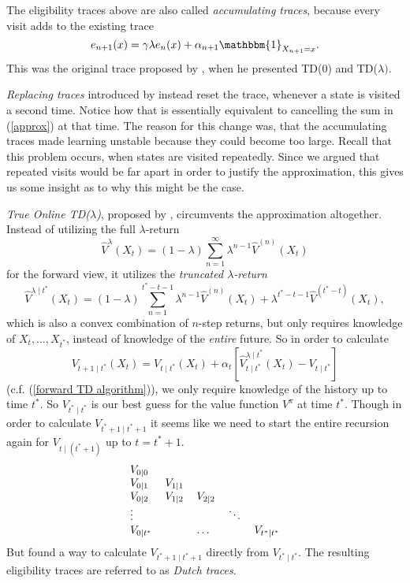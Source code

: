 The eligibility traces above are also called \emph{accumulating traces}, because every visit adds to the existing trace
\[
	e_{n+1}(x) = \gamma\lambda e_n(x) + \alpha_{n+1} \mathbbm{1}_{X_{n+1}=x}.
\]
This was the original trace proposed by \textcite{suttonLearningPredictMethods1988}, when he presented TD(0) and TD(\(\lambda)\). 

\emph{Replacing traces} introduced by \textcite{singhReinforcementLearningReplacing1996} instead reset the trace, whenever a state is visited a second time. Notice how that is essentially equivalent to cancelling the sum in (\ref{approx}) at that time. The reason for this change was, that the accumulating traces made learning unstable because they could become too large. Recall that this problem occurs, when states are visited repeatedly. Since we argued that repeated visits would be far apart in order to justify the approximation, this gives us some insight as to why this might be the case. 

\emph{True Online TD(\(\lambda\))}, proposed by \textcite{vanseijenTrueOnlineTD2014}, circumvents the approximation altogether. Instead of utilizing the full \(\lambda\)-return
\[
	\hat{V}^\lambda(X_t)=(1-\lambda)\sum_{n=1}^\infty \lambda^{n-1} \hat{V}^{(n)}(X_t)
\]
for the forward view, it utilizes the \emph{truncated \(\lambda\)-return}
\[
	\hat{V}^{\lambda\mid t^*}(X_t)=(1-\lambda)\sum_{n=1}^{t^*-t-1} \lambda^{n-1} \hat{V}^{(n)}(X_t) + \lambda^{t^*-t-1}\hat{V}^{(t^*-t)}(X_t),
\]
which is also a convex combination of \(n\)-step returns, but only requires knowledge of \(X_t,\dots,X_{t^*}\), instead of knowledge of the \emph{entire} future. So in order to calculate
\[
	V_{t+1\mid t^*}(X_t)
	=V_{t\mid t^*}(X_t)
	+\alpha_t\left[\hat{V}_{t\mid t^*}^{\lambda\mid t^*}(X_t)-V_{t\mid t^*}\right]
\]
(c.f. (\ref{forward TD algorithm})), we only require knowledge of the history up to time \(t^*\). So \(V_{t^*\mid t^*}\) is our best guess for the value function \(V^\pi\) at time \(t^*\). 
Though in order to calculate \(V_{t^*+1\mid t^*+1}\) it seems like we need to start the entire recursion again for \(V_{t\mid (t^*+1)}\) up to \(t=t^*+1\).
\[
\begin{tabular}{l l l l l}
	\(V_{0\mid 0}\) & & & &\\
	\(V_{0\mid 1}\) & \(V_{1\mid 1}\) & & &\\
	\(V_{0\mid 2}\) & \(V_{1\mid 2}\) &\(V_{2\mid 2}\) & &\\
	\(\vdots\) & & & \(\ddots\) & \\
	\(V_{0\mid t^*}\) & &\dots & & \(V_{t^*\mid t^*}\)
\end{tabular}
\]
But \textcite{vanseijenTrueOnlineTD2014} found a way to calculate \(V_{t^*+1\mid t^*+1}\) directly from \(V_{t^*\mid t^*}\). The resulting eligibility traces are referred to as \emph{Dutch traces}.

